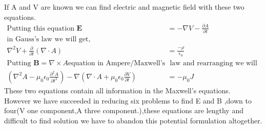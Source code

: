 \begin{center}
\end{center}
If A and V are known we can find electric and magnetic field with these two equations.
\begin{align*}
\text{Putting this equation }\mathbf{E}&=-\nabla V-\frac{\partial A}{\partial t}\\  \text{in Gauss's law we will get,}\\
\nabla ^2V+\frac{\partial }{\partial t}(\nabla \cdot A)&=\frac{-\rho}{\epsilon_{0}}\\
\text{Putting }\mathbf{B}=\nabla\times A\text{equation in Ampere/Maxwell's }&\text{  law and rearranging we will get,}\\
\left( \nabla^2A-\mu_{0}\epsilon_{0}\frac{\partial^2 A}{\partial t^2}\right) -\nabla\left( \nabla \cdot A+\mu_{0}\epsilon_{0}\frac{\partial V}{\partial t}\right) &=-\mu_{0} J
\end{align*}
These two equations contain all information in the Maxwell's equations.\\
However we have succeeded in reducing six problems to find E and B ,down to four(V one component,A three component.),these equations are lengthy and difficult to find solution we have to abandon this potential formulation altogether.\\
